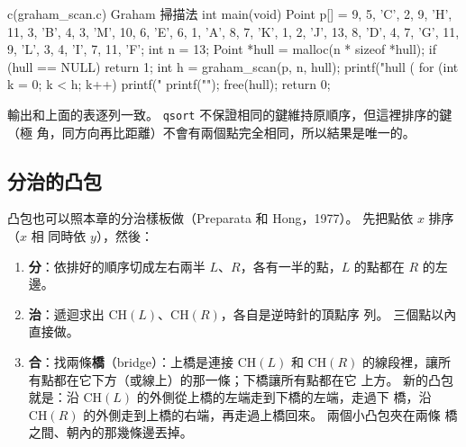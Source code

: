 \begin{example}[label=ex:dc-graham]{c}{(graham\_scan.c) Graham 掃描法}
int main(void)
{
    Point p[] = {{9, 5, 'C'}, {2, 9, 'H'}, {11, 3, 'B'}, {4, 3, 'M'}, {10, 6, 'E'},
                 {6, 1, 'A'}, {8, 7, 'K'}, {1, 2, 'J'}, {13, 8, 'D'}, {4, 7, 'G'},
                 {11, 9, 'L'}, {3, 4, 'I'}, {7, 11, 'F'}};
    int n = 13;
    Point *hull = malloc(n * sizeof *hull);
    if (hull == NULL) {
        return 1;
    }
    int h = graham_scan(p, n, hull);
    printf("hull (%
    for (int k = 0; k < h; k++) {
        printf(" %
    }
    printf("\n");
    free(hull);
    return 0;
}
\end{example}

輸出和上面的表逐列一致。 \texttt{qsort} 不保證相同的鍵維持原順序，但這裡排序的鍵（極
角，同方向再比距離）不會有兩個點完全相同，所以結果是唯一的。

\subsection{分治的凸包}
\label{sec:dc-hull-dc}

凸包也可以照本章的分治樣板做（Preparata 和 Hong，1977）。 先把點依 $x$ 排序（$x$ 相
同時依 $y$），然後：

\begin{enumerate}
\item \textbf{分}：依排好的順序切成左右兩半 $L$、$R$，各有一半的點，$L$ 的點都在
$R$ 的左邊。
\item \textbf{治}：遞迴求出 $\mathrm{CH}(L)$、$\mathrm{CH}(R)$，各自是逆時針的頂點序
列。 三個點以內直接做。
\item \textbf{合}：找兩條\textbf{橋}（bridge）：上橋是連接 $\mathrm{CH}(L)$ 和
$\mathrm{CH}(R)$ 的線段裡，讓所有點都在它下方（或線上）的那一條；下橋讓所有點都在它
上方。 新的凸包就是：沿 $\mathrm{CH}(L)$ 的外側從上橋的左端走到下橋的左端，走過下
橋，沿 $\mathrm{CH}(R)$ 的外側走到上橋的右端，再走過上橋回來。 兩個小凸包夾在兩條
橋之間、朝內的那幾條邊丟掉。
\end{enumerate}

